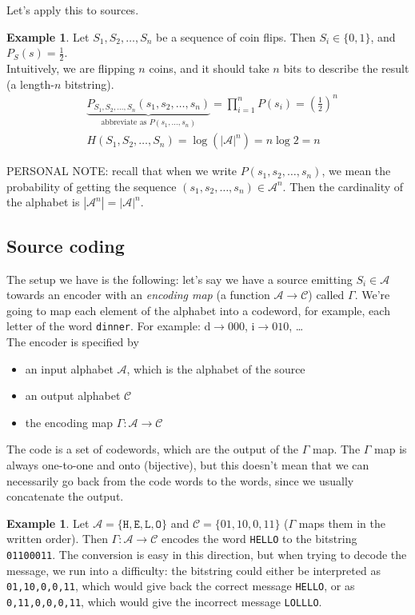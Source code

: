 \documentclass{report}
\theoremstyle{plain}
\theoremstyle{definition}
\newtheorem{exmp}[thm]{Example}
\theoremstyle{remark}
\begin{document}
Let's apply this to sources.

\begin{exmp}
	Let $S_1, S_2, \ldots, S_n$ be a sequence of coin flips. Then $S_i \in \{0, 1\}$, and $P_S(s) = \frac12$. \\
Intuitively, we are flipping $n$ coins, and it should take $n$ bits to describe the result (a length-$n$ bitstring).
\begin{align*}
	&\underbrace{P_{S_1, S_2, \ldots, S_n}(s_1, s_2, \ldots, s_n)}_{\text{abbreviate as } P(s_1, \ldots, s_n)} = \prod_{i=1}^n P(s_i) = \left(\frac12 \right)^n \\
	&H(S_1, S_2, \ldots, S_n) = \log\left(|\mathcal A|^n \right) = n \log 2 = n
\end{align*}
\end{exmp}

PERSONAL NOTE: recall that when we write $P(s_1, s_2, \ldots, s_n)$, we mean the probability of getting the sequence $(s_1, s_2, \ldots, s_n) \in \mathcal A^n$. Then the cardinality of the alphabet is $|\mathcal A^n| = |\mathcal A|^n$.

\subsection{Source coding}
The setup we have is the following: let's say we have a source emitting $S_i \in \mathcal A$ towards an encoder with an \emph{encoding map} (a function $\mathcal A \to \mathcal C$) called $\Gamma$. We're going to map each element of the alphabet into a codeword, for example, each letter of the word \texttt{dinner}. For example: d$\to 000$, i$\to 010$, \dots \\
The encoder is specified by
\begin{itemize}
	\item an input alphabet $\mathcal A$, which is the alphabet of the source
	\item an output alphabet $\mathcal C$
	\item the encoding map $\Gamma : \mathcal A \to \mathcal C$
\end{itemize}
The code is a set of codewords, which are the output of the $\Gamma$ map. The $\Gamma$ map is always one-to-one and onto (bijective), but this doesn't mean that we can necessarily go back from the code words to the words, since we usually concatenate the output.

\begin{exmp}
 Let $\mathcal A = \{\texttt H, \texttt E, \texttt L, \texttt O\}$ and $\mathcal C = \{01, 10, 0, 11\}$ ($\Gamma$ maps them in the written order). Then $\Gamma : \mathcal A \to \mathcal C$ encodes the word \texttt{HELLO} to the bitstring \texttt{01100011}. The conversion is easy in this direction, but when trying to decode the message, we run into a difficulty: the bitstring could either be interpreted as \texttt{01,10,0,0,11}, which would give back the correct message \texttt{HELLO}, or as \texttt{0,11,0,0,0,11}, which would give the incorrect message \texttt{LOLLLO}.
\end{exmp}
\end{document}
